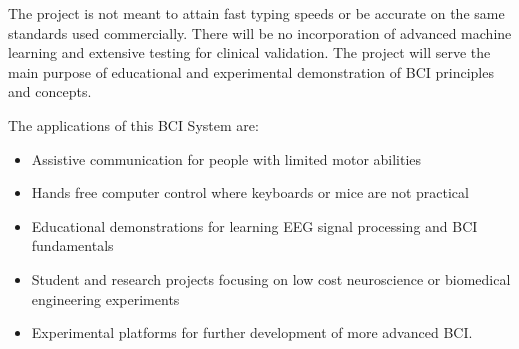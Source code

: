 The project is not meant to attain fast typing speeds or be accurate on the same standards used commercially. There will be no incorporation of advanced machine learning and extensive testing for clinical validation. The project will serve the main purpose of educational and experimental demonstration of BCI principles and concepts.

The applications of this BCI System are:\begin{itemize}
	\item Assistive communication for people with limited motor abilities
	\item Hands free computer control where keyboards or mice are not practical
	\item Educational demonstrations for learning EEG signal processing and BCI fundamentals
	\item Student and research projects focusing on low cost neuroscience or biomedical engineering experiments
	\item Experimental platforms for further development of more advanced BCI.
\end{itemize}
